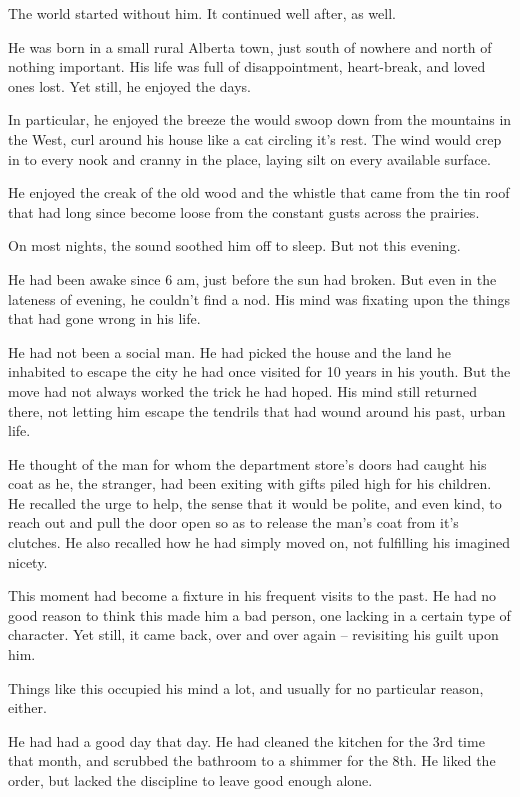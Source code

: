 \documentclass[fontsize=12pt,english]{scrreprt}
\begin{document}
The world started without him. It continued well after, as well.

He was born in a small rural Alberta town, just south of nowhere and
north of nothing important. His life was full of disappointment,
heart-break, and loved ones lost. Yet still, he enjoyed the days.

In particular, he enjoyed the breeze the would swoop down from the
mountains in the West, curl around his house like a cat circling it's
rest. The wind would crep in to every nook and cranny in the place,
laying silt on every available surface.

He enjoyed the creak of the old wood and the whistle that came from
the tin roof that had long since become loose from the constant gusts
across the prairies.

On most nights, the sound soothed him off to sleep. But not this evening.

He had been awake since 6 am, just before the sun had broken. But even
in the lateness of evening, he couldn't find a nod. His mind was
fixating upon the things that had gone wrong in his life.

He had not been a social man. He had picked the house and the land he
inhabited to escape the city he had once visited for 10 years in his
youth. But the move had not always worked the trick he had hoped. His
mind still returned there, not letting him escape the tendrils that
had wound around his past, urban life.

He thought of the man for whom the department store's doors had caught
his coat as he, the stranger, had been exiting with gifts piled high
for his children. He recalled the urge to help, the sense that it
would be polite, and even kind, to reach out and pull the door open so
as to release the man's coat from it's clutches. He also recalled how
he had simply moved on, not fulfilling his imagined nicety.

This moment had become a fixture in his frequent visits to the
past. He had no good reason to think this made him a bad person, one
lacking in a certain type of character. Yet still, it came back, over
and over again -- revisiting his guilt upon him.

Things like this occupied his mind a lot, and usually for no
particular reason, either.

He had had a good day that day. He had cleaned the kitchen for the 3rd
time that month, and scrubbed the bathroom to a shimmer for the
8th. He liked the order, but lacked the discipline to leave good
enough alone.
\end{document}
